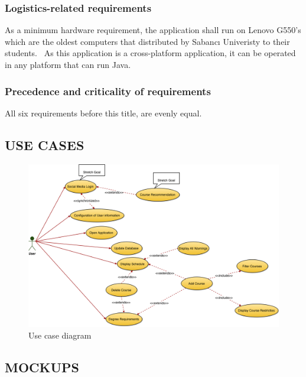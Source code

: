 \documentclass[twoside,letterpaper]{article}
\begin{document}
\subsubsection[Logistics{}-related
requirements]{\rmfamily\bfseries\color{black}
Logistics-related requirements}

{\color{black}
As a minimum hardware requirement, the application shall run on Lenovo G550{\textquoteright}s which are the oldest computers that distributed by Sabanc\i{} Univeristy to their students. \ As this application is a cross-platform application, it can be operated in any platform that can run Java.}

\subsubsection[Precedence and criticality of
requirements]{\rmfamily\bfseries\color{black}
Precedence and criticality of requirements}

{\color{black}
All six requirements before this title, are evenly equal.}

\subsection[USE CASES]{\rmfamily\bfseries\color{black}
USE CASES}

\begin{figure}[h]
\centering
\includegraphics[width=\linewidth]{usecasediagram.png}
\caption{Use case diagram}
\label{fig:usecase_diagram}
\end{figure}

\subsection[MOCKUPS]{\rmfamily\bfseries\color{black}
	MOCKUPS}
\end{document}

